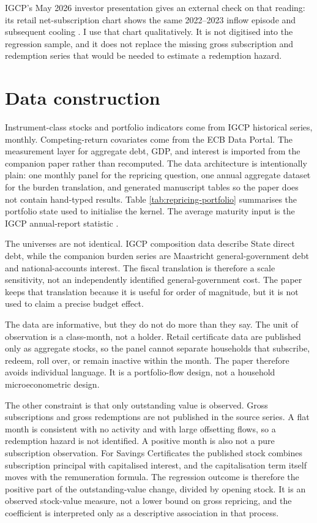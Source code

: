 \documentclass[11pt,a4paper]{article}
\begin{document}
IGCP's May 2026 investor presentation gives an external check on that reading:
its retail net-subscription chart shows the same 2022--2023 inflow episode and
subsequent cooling \cite{igcp2026}. I use that chart qualitatively. It is not
digitised into the regression sample, and it does not replace the missing
gross subscription and redemption series that would be needed to estimate a
redemption hazard.

\section{Data construction}
\label{sec:data}

Instrument-class stocks and portfolio indicators come from IGCP historical
series, monthly. Competing-return covariates come from the ECB Data Portal. The
measurement layer for aggregate debt, GDP, and interest is imported from the
companion paper rather than recomputed. The data architecture is intentionally
plain: one monthly panel for the repricing question, one annual aggregate
dataset for the burden translation, and generated manuscript tables so the
paper does not contain hand-typed results. Table \ref{tab:repricing-portfolio}
summarises the portfolio state used to initialise the kernel. The average
maturity input is the IGCP annual-report statistic \cite{igcp2024}.

The universes are not identical. IGCP composition data describe State direct
debt, while the companion burden series are Maastricht general-government debt
and national-accounts interest. The fiscal translation is therefore a scale
sensitivity, not an independently identified general-government cost. The paper
keeps that translation because it is useful for order of magnitude, but it is
not used to claim a precise budget effect.



The data are informative, but they do not do more than they say. The unit of
observation is a class-month, not a holder. Retail certificate data are
published only as aggregate stocks, so the panel cannot separate households
that subscribe, redeem, roll over, or remain inactive within the month. The
paper therefore avoids individual language. It is a portfolio-flow design, not
a household microeconometric design.

The other constraint is that only outstanding value is observed. Gross
subscriptions and gross redemptions are not published in the source series. A
flat month is consistent with no activity and with large offsetting flows, so a
redemption hazard is not identified. A positive month is also not a pure
subscription observation. For Savings Certificates the published stock combines
subscription principal with capitalised interest, and the capitalisation term
itself moves with the remuneration formula. The regression outcome is therefore
the positive part of the outstanding-value change, divided by opening stock. It
is an observed stock-value measure, not a lower bound on gross repricing, and
the coefficient is interpreted only as a descriptive association in that
process.
\end{document}
